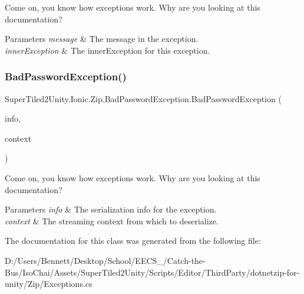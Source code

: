 Come on, you know how exceptions work. Why are you looking at this documentation? 


\begin{DoxyParams}{Parameters}
{\em message} & The message in the exception.\\
\hline
{\em inner\+Exception} & The inner\+Exception for this exception.\\
\hline
\end{DoxyParams}
\mbox{\label{class_super_tiled2_unity_1_1_ionic_1_1_zip_1_1_bad_password_exception_aaa51886dc5758de5326b3d9fe423de04}} 
\subsubsection{\texorpdfstring{Bad\+Password\+Exception()}{BadPasswordException()}\hspace{0.1cm}{\footnotesize\ttfamily [4/4]}}
{\footnotesize\ttfamily Super\+Tiled2\+Unity.\+Ionic.\+Zip.\+Bad\+Password\+Exception.\+Bad\+Password\+Exception (\begin{DoxyParamCaption}\item[{Serialization\+Info}]{info,  }\item[{Streaming\+Context}]{context }\end{DoxyParamCaption})\hspace{0.3cm}{\ttfamily [protected]}}



Come on, you know how exceptions work. Why are you looking at this documentation? 


\begin{DoxyParams}{Parameters}
{\em info} & The serialization info for the exception.\\
\hline
{\em context} & The streaming context from which to deserialize.\\
\hline
\end{DoxyParams}


The documentation for this class was generated from the following file\+:\begin{DoxyCompactItemize}
\item 
D\+:/\+Users/\+Bennett/\+Desktop/\+School/\+E\+E\+C\+S\+\_/\+Catch-\/the-\/\+Bus/\+Iso\+Chai/\+Assets/\+Super\+Tiled2\+Unity/\+Scripts/\+Editor/\+Third\+Party/dotnetzip-\/for-\/unity/\+Zip/Exceptions.\+cs\end{DoxyCompactItemize}
